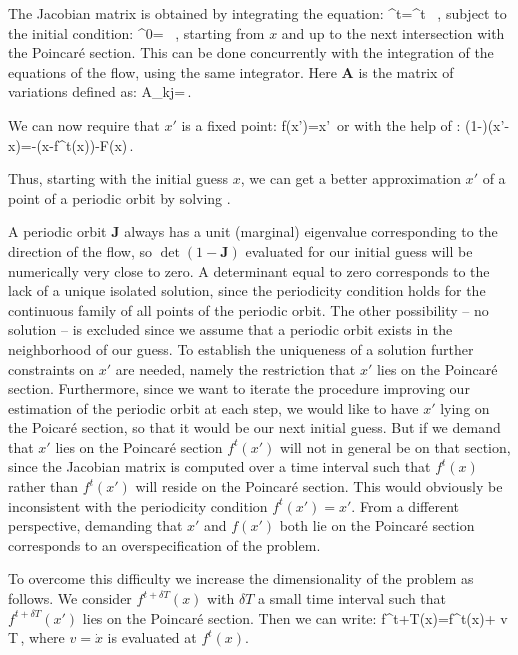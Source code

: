 \documentclass[pre,preprint,groupedaddress,showpacs,showkeys]{revtex4}
\begin{document}
  The Jacobian matrix is obtained by integrating the equation:
  \beq
   ^t=^t \, ,
   \label{eq:Adef}
  \eeq
  subject to the initial condition:
  \beq
   ^0= \ ,
  \eeq
  starting from $x$ and up to the next intersection with the Poincar\'e section.
  This can be done concurrently with the integration of the equations of the flow,
  using the same integrator. Here $\mathbf{A}$ is the matrix of variations defined as:
  \beq
   A_{kj}=\,.
  \eeq

  We can now require that $x'$ is a fixed point:
  \beq
   f(x')=x'\,
  \eeq
  or with the help of :
  \beq
   (1-)(x'-x)=-(x-f^t(x))\equiv-F(x)\,.
   \label{eq:Newton Algebraic}
  \eeq

  Thus, starting with the initial guess $x$, we can get a better approximation
  $x'$ of a point of a periodic orbit by solving .

  A periodic orbit $\mathbf{J}$ always has a unit (marginal) eigenvalue corresponding to
  the direction of the flow, so $\det(1-\mathbf{J})$ evaluated for our initial guess will be numerically very close
  to zero. A determinant equal to zero corresponds to the lack of
  a unique isolated solution, since the periodicity condition holds for the continuous
  family of all points of the periodic orbit.
  The other possibility -- no solution -- is excluded since we assume that
  a periodic orbit exists in the neighborhood of our guess. To establish the uniqueness of a solution further
  constraints on $x'$ are needed, namely the restriction that $x'$ lies on the Poincar\'e section.
  Furthermore, since we want to iterate the procedure improving our estimation of the periodic
  orbit at each step, we would like to
  have $x'$ lying on the Poicar\'e section, so that it would be our next initial guess.
  But if we demand that $x'$ lies on the Poincar\'e section $f^t(x')$ will not in general
  be on that section, since the Jacobian matrix is computed over a time interval
  such that $f^t(x)$ rather than $f^t(x')$ will
  reside on the Poincar\'e section. This would obviously be inconsistent with the periodicity condition $f^t(x')=x'$.
  From a different perspective, demanding that $x'$ and $f(x')$ both lie on the Poincar\'e section
  corresponds to an overspecification of the problem.

  To overcome this difficulty we increase the dimensionality of the problem as follows. We consider
  $f^{t+\delta T}(x)$ with $\delta T$ a small time interval such that $f^{t+\delta T}(x')$ lies on the
  Poincar\'e section. Then we can write:
  \beq
   f^{t+\delta T}(x)=f^t(x)+ v \delta T\,,
   \label{eq:NewtonTimeTaylor}
  \eeq
  where $v=\dot{x}$ is evaluated at $f^t(x)$. %
\end{document}
